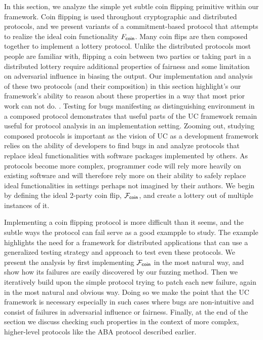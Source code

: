 In this section, we analyze the simple yet subtle coin flipping primitive
within our framework.  Coin flipping is used throughout cryptographic and
distributed protocols, and we present variants of a commitment-based protocol
that attempts to realize the ideal coin functionality $F_{{\mathsf {coin}}}$.  Many coin
flips are then composed together to implement a lottery protocol.  Unlike the
distributed protocols most people are familiar with, flipping a coin between
two parties or taking part in a distributed lottery require additional
properties of fairness and some limitation on adversarial influence in biasing
the output.  Our implementation and analysis of these two protocols (and their
composition) in this section highlight's our framework's ability to reason
about these properties in a way that most prior work can not do.  .  Testing for bugs manifesting as distinguishing environment in a
composed protocol demonstrates that useful parts of the UC framework remain
useful for protocol analysis in an implementation setting.  Zooming out,
studying composed protocols is important as the vision of UC as a development
framework relies on the ability of developers to find bugs in and analyze
protocols that replace ideal functionalities with software packages implemented
by others.  As protocols become more complex, programmer code will rely more
heavily on existing software and will therefore rely more on their ability to
safely replace ideal functionalities in settings perhaps not imagined by their
authors.  We begin by defining the ideal 2-party coin flip, $\mathcal{F}_{{\mathsf {coin}}}$, and
create a lottery out of multiple instances of it.

Implementing a coin flipping protocol is more difficult than it seems, and the
subtle ways the protocol can fail serve as a good exampple to study.  The
example highlights the need for a framework for distributed applications that
can use a generalized testing strategy and approach to test even these
protocols.  We present the analysis by first implementing $\mathcal{F}_{{\mathsf {coin}}}$ in the
most natural way, and show how its failures are easily discovered by our
fuzzing method.  Then we iteratively build upon the simple protocol trying to
patch each new failure, again in the most natural and obvious way.  Doing so we
make the point that the UC framework is necessary especially in such cases
where bugs are non-intuitive and consist of failures in adversarial influence
or fairness.  Finally, at the end of the section we discuss checking such
properties in the context of more complex, higher-level protocols like the ABA
protocol described earlier.


